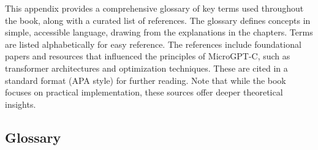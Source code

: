 \documentclass[
]{article}
\begin{document}
This appendix provides a comprehensive glossary of key terms used
throughout the book, along with a curated list of references. The
glossary defines concepts in simple, accessible language, drawing from
the explanations in the chapters. Terms are listed alphabetically for
easy reference. The references include foundational papers and resources
that influenced the principles of MicroGPT-C, such as transformer
architectures and optimization techniques. These are cited in a standard
format (APA style) for further reading. Note that while the book focuses
on practical implementation, these sources offer deeper theoretical
insights.

\subsection{Glossary}\label{glossary}
\end{document}
